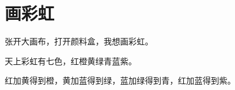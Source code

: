 \documentclass[12pt,UTF-8,openany]{ctexbook}
\begin{document}
\hanzibox{}\hanzibox{}\hanzibox{}\hanzibox{}\hspace{1em}\hanzibox{}\hanzibox{}\hanzibox{}\hanzibox{}

\hanzibox{}\hanzibox{}\hanzibox{}\hanzibox{}\hspace{1em}\hanzibox{}\hanzibox{}\hanzibox{}\hanzibox{}

\hanzibox{}\hanzibox{}\hanzibox{}\hanzibox{}\hspace{1em}\hanzibox{}\hanzibox{}\hanzibox{}\hanzibox{}

\hanzibox{}\hanzibox{}\hanzibox{}\hanzibox{}\hspace{1em}\hanzibox{}\hanzibox{}\hanzibox{}\hanzibox{}






\chapter{画彩虹}

\begin{large}
    
    张开大画布，打开颜料盒，我想画彩虹。
    
    天上彩虹有七色，红橙黄绿青蓝紫。
    
    红加黄得到橙，黄加蓝得到绿，蓝加绿得到青，红加蓝得到紫。
    
\end{large}


\clearpage

\begin{center}
    
    
    
\end{center}


\hanzibox{}\hanzibox{}\hanzibox{}\hanzibox{}\hspace{1em}\hanzibox{}\hanzibox{}\hanzibox{}\hanzibox{}

\hanzibox{}\hanzibox{}\hanzibox{}\hanzibox{}\hspace{1em}\hanzibox{}\hanzibox{}\hanzibox{}\hanzibox{}

\hanzibox{}\hanzibox{}\hanzibox{}\hanzibox{}\hspace{1em}\hanzibox{}\hanzibox{}\hanzibox{}\hanzibox{}
\end{document}
